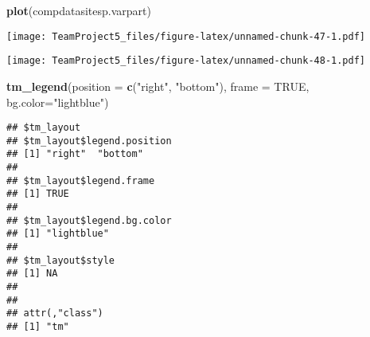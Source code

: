 \documentclass[
]{article}
\newenvironment{Shaded}{\begin{snugshade}}{\end{snugshade}}
\newcommand{\CommentTok}[1]{\textcolor[rgb]{0.56,0.35,0.01}{\textit{#1}}}
\newcommand{\DataTypeTok}[1]{\textcolor[rgb]{0.13,0.29,0.53}{#1}}
\newcommand{\DecValTok}[1]{\textcolor[rgb]{0.00,0.00,0.81}{#1}}
\newcommand{\KeywordTok}[1]{\textcolor[rgb]{0.13,0.29,0.53}{\textbf{#1}}}
\newcommand{\NormalTok}[1]{#1}
\newcommand{\OperatorTok}[1]{\textcolor[rgb]{0.81,0.36,0.00}{\textbf{#1}}}
\newcommand{\OtherTok}[1]{\textcolor[rgb]{0.56,0.35,0.01}{#1}}
\newcommand{\StringTok}[1]{\textcolor[rgb]{0.31,0.60,0.02}{#1}}
\begin{document}
\begin{Shaded}
\begin{Highlighting}[]
\KeywordTok{plot}\NormalTok{(compdatasitesp.varpart)}
\end{Highlighting}
\end{Shaded}

\texttt{[image: TeamProject5\_files/figure-latex/unnamed-chunk-47-1.pdf]}

\begin{Shaded}
\end{Shaded}

\texttt{[image: TeamProject5\_files/figure-latex/unnamed-chunk-48-1.pdf]}

\begin{Shaded}
\begin{Highlighting}[]
\KeywordTok{tm_legend}\NormalTok{(}\DataTypeTok{position =} \KeywordTok{c}\NormalTok{(}\StringTok{"right"}\NormalTok{, }\StringTok{"bottom"}\NormalTok{), }
    \DataTypeTok{frame =} \OtherTok{TRUE}\NormalTok{,}
    \DataTypeTok{bg.color=}\StringTok{"lightblue"}\NormalTok{)}
\end{Highlighting}
\end{Shaded}

\begin{verbatim}
## $tm_layout
## $tm_layout$legend.position
## [1] "right"  "bottom"
## 
## $tm_layout$legend.frame
## [1] TRUE
## 
## $tm_layout$legend.bg.color
## [1] "lightblue"
## 
## $tm_layout$style
## [1] NA
## 
## 
## attr(,"class")
## [1] "tm"
\end{verbatim}
\end{document}
